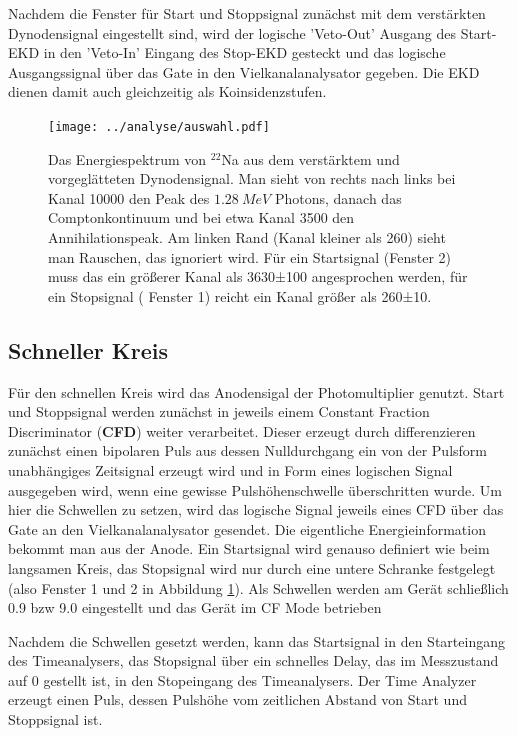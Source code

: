 \documentclass[a4paper,12pt]{article}
\begin{document}
Nachdem die Fenster für Start und Stoppsignal zunächst mit dem verstärkten Dynodensignal eingestellt sind,
wird der logische 'Veto-Out' Ausgang des Start-EKD in den 'Veto-In' Eingang des Stop-EKD gesteckt und das logische Ausgangssignal über das Gate
in den Vielkanalanalysator gegeben.
Die EKD dienen damit auch gleichzeitig als Koinsidenzstufen.

\begin{figure}[h]
	\centering
	\texttt{[image: ../analyse/auswahl.pdf]}
	\caption{Das Energiespektrum von $^{22}$Na aus dem verstärktem und vorgeglätteten
		Dynodensignal.
		Man sieht von rechts nach links bei Kanal 10000 den Peak des $\SI{1.28}{MeV}$ Photons,
		danach das Comptonkontinuum und bei etwa Kanal 3500 den Annihilationspeak.
		Am linken Rand (Kanal kleiner als 260) sieht man Rauschen, das ignoriert wird.
		Für ein Startsignal (Fenster 2) muss das ein größerer Kanal als 3630±100 angesprochen werden, 
		für ein Stopsignal ( Fenster 1) reicht ein Kanal größer als 260±10.}
	\label{fig:auswahl}
\end{figure}


\subsection*{Schneller Kreis}
Für den schnellen Kreis wird das Anodensigal der Photomultiplier genutzt.
Start und Stoppsignal werden zunächst in jeweils einem Constant
Fraction Discriminator (\textbf{CFD}) weiter verarbeitet.
Dieser erzeugt durch differenzieren zunächst einen bipolaren Puls aus dessen Nulldurchgang ein von der Pulsform unabhängiges Zeitsignal erzeugt wird
und in Form eines logischen Signal ausgegeben wird, wenn eine gewisse Pulshöhenschwelle überschritten wurde.
Um hier die Schwellen zu setzen, wird das logische Signal jeweils eines CFD über das Gate an den Vielkanalanalysator gesendet.
Die eigentliche Energieinformation bekommt man aus der Anode.
Ein Startsignal wird genauso definiert wie beim langsamen Kreis, das Stopsignal wird nur durch eine untere Schranke festgelegt (also Fenster 1 und 2 in Abbildung \ref{fig:auswahl}).
Als Schwellen werden am Gerät schließlich 0.9 bzw 9.0 eingestellt und das Gerät im CF Mode betrieben

Nachdem die Schwellen gesetzt werden, kann das Startsignal in den Starteingang des Timeanalysers, das Stopsignal über ein schnelles Delay, das im Messzustand auf 0 gestellt ist, in den Stopeingang des Timeanalysers.
Der Time Analyzer erzeugt einen Puls, dessen Pulshöhe vom zeitlichen Abstand von Start und Stoppsignal ist.
\end{document}
